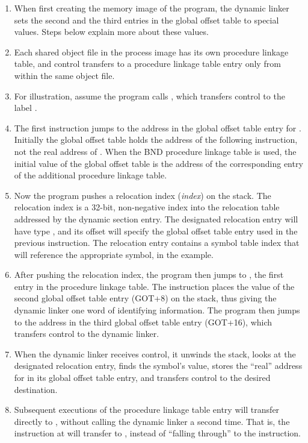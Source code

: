 \begin{enumerate}
\item When first creating the memory image of the program, the dynamic
  linker sets the second and the third entries in the global offset
  table to special values.  Steps below explain more about these
  values.
\item Each shared object file in the process image has its own
  procedure linkage table, and control transfers to a procedure
  linkage table entry only from within the same object file.
\item For illustration, assume the program calls , which
  transfers control to the label .
\item The first instruction jumps to the address in the global offset
  table entry for .  Initially the global offset table
  holds the address of the following  instruction, not the
  real address of .  When the BND procedure linkage table
  is used, the initial value of the global offset table is the
  address of the corresponding entry of the additional procedure
  linkage table.
\item Now the program pushes a relocation index (\textit{index}) on
  the stack. The relocation index is a 32-bit, non-negative index into
  the relocation table addressed by the  dynamic
  section entry.  The designated relocation entry will have type
  , and its offset will specify the
  global offset table entry used in the previous 
  instruction.  The relocation entry contains a symbol table index
  that will reference the appropriate symbol,  in the
  example.
\item After pushing the relocation index, the program then jumps to
  , the first entry in the procedure linkage table.  The
   instruction places the value of the second global
  offset table entry (GOT+8) on the stack, thus giving the dynamic
  linker one word of identifying information.  The program then jumps
  to the address in the third global offset table entry (GOT+16),
  which transfers control to the dynamic linker.
\item When the dynamic linker receives control, it unwinds the stack,
  looks at the designated relocation entry, finds the symbol's value,
  stores the ``real'' address for  in its global offset
  table entry, and transfers control to the desired destination.
\item Subsequent executions of the procedure linkage table entry will
  transfer directly to , without calling the dynamic
  linker a second time.  That is, the  instruction at
   will transfer to , instead of ``falling
  through'' to the  instruction.
\end{enumerate}

